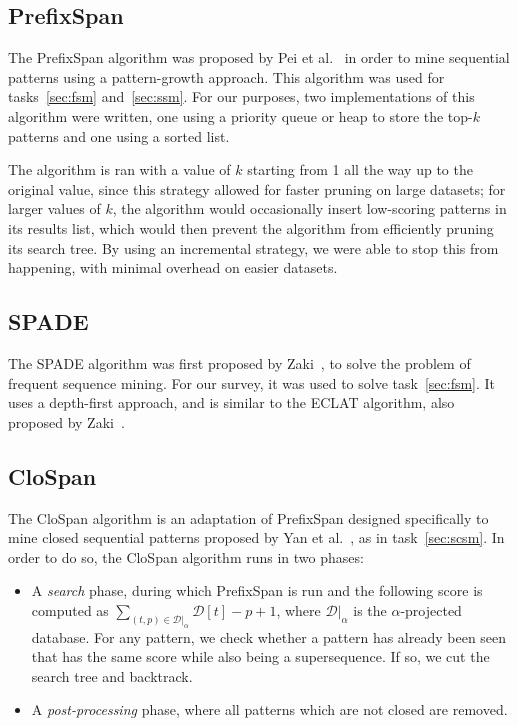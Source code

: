 \documentclass{sigkddExp}
\newcommand{\db}{\mathcal{D}}
\newcommand{\ps}{\textsf{PrefixSpan}}
\newcommand{\cs}{\textsf{CloSpan}}
\newcommand{\spade}{\textsf{SPADE}}
\begin{document}
\subsection{PrefixSpan}
The \ps{} algorithm was proposed by Pei et al.~\cite{Pei2001, Pei2004} in order to mine sequential patterns using a pattern-growth approach.
This algorithm was used for tasks~\ref{sec:fsm} and~\ref{sec:ssm}.
For our purposes, two implementations of this algorithm were written, one using a priority queue or heap to store the top-\(k\) patterns and one using a sorted list.

The algorithm is ran with a value of \(k\) starting from 1 all the way up to the original value, since this strategy allowed for faster pruning on large datasets; for larger values of \(k\), the algorithm would occasionally insert low-scoring patterns in its results list, which would then prevent the algorithm from efficiently pruning its search tree.
By using an incremental strategy, we were able to stop this from happening, with minimal overhead on easier datasets.

\subsection{SPADE}
The \spade{} algorithm was first proposed by Zaki~\cite{Zaki2001}, to solve the problem of frequent sequence mining.
For our survey, it was used to solve task~\ref{sec:fsm}.
It uses a depth-first approach, and is similar to the \textsf{ECLAT} algorithm, also proposed by Zaki~\cite{Zaki2000}.

\subsection{CloSpan}
\label{sec:clospan}
The \cs{} algorithm is an adaptation of \ps{} designed specifically to mine closed sequential patterns proposed by Yan et al.~\cite{Yan2003}, as in task~\ref{sec:scsm}.
In order to do so, the \cs{} algorithm runs in two phases:
\begin{itemize}
	\item A \emph{search} phase, during which \ps{} is run and the following score is computed as \(\sum_{(t, p) \in \db|_\alpha} \db[t] - p + 1\), where \(\db|_\alpha\) is the \(\alpha\)-projected database.
	For any pattern, we check whether a pattern has already been seen that has the same score while also being a supersequence.
	If so, we cut the search tree and backtrack.
	\item A \emph{post-processing} phase, where all patterns which are not closed are removed.
\end{itemize}
\end{document}
